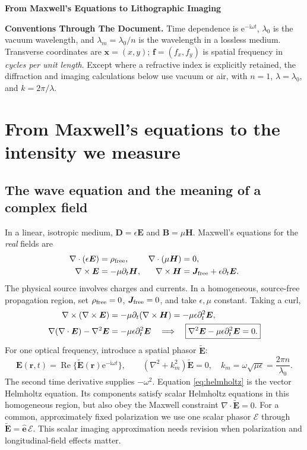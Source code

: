 \documentclass[11pt,a4paper]{article}
\numberwithin{equation}{section}
\newcommand{\ii}{\mathrm{i}}
\newcommand{\ee}{\mathrm{e}}
\newcommand{\vct}[1]{\bm{#1}}
\newcommand{\Real}{\operatorname{Re}}
\begin{document}
{\LARGE\color{ink}\bfseries From Maxwell's Equations to Lithographic Imaging\par}

\vspace{5mm}

\textbf{Conventions Through The Document.} Time dependence is $\ee^{-\ii\omega t}$, $\lambda_0$
is the vacuum wavelength, and $\lambda_m=\lambda_0/n$ is the wavelength
in a lossless medium. Transverse coordinates are $\vct x=(x,y)$;
$\vct f=(f_x,f_y)$ is spatial frequency in \emph{cycles per unit length}.
Except where a refractive index is explicitly retained, the diffraction
and imaging calculations below use vacuum or air, with
$n=1$, $\lambda=\lambda_0$, and $k=2\pi/\lambda$.

\section{From Maxwell's equations to the intensity we measure}
\subsection{The wave equation and the meaning of a complex field}
In a linear, isotropic medium, $\vct D=\epsilon\vct E$ and
$\vct B=\mu\vct H$. Maxwell's equations for the \emph{real} fields are
\begin{align}
\nabla\cdot(\epsilon\vct E)&=\rho_{\rm free},&
\nabla\cdot(\mu\vct H)&=0,\notag\\
\nabla\times\vct E&=-\mu\partial_t\vct H,&
\nabla\times\vct H&=\vct J_{\rm free}+\epsilon\partial_t\vct E.
\end{align}
The physical source involves charges and currents. In a homogeneous,
source-free propagation region, set $\rho_{\rm free}=0$,
$\vct J_{\rm free}=0$, and take $\epsilon,\mu$ constant. Taking a curl,
\begin{align}
\nabla\times(\nabla\times\vct E)
&=-\mu\partial_t(\nabla\times\vct H)
=-\mu\epsilon\partial_t^2\vct E,\notag\\
\nabla(\nabla\cdot\vct E)-\nabla^2\vct E
&=-\mu\epsilon\partial_t^2\vct E
\quad\Longrightarrow\quad
\boxed{\nabla^2\vct E-\mu\epsilon\partial_t^2\vct E=0.}
\end{align}
For one optical frequency, introduce a spatial phasor
$\widetilde{\vct E}$:
\begin{equation}
\vct E(\vct r,t)=\Real\{\widetilde{\vct E}(\vct r)\ee^{-\ii\omega t}\},
\qquad
\boxed{(\nabla^2+k_m^2)\widetilde{\vct E}=0,\quad
k_m=\omega\sqrt{\mu\epsilon}=\frac{2\pi n}{\lambda_0}.}
\label{eq:helmholtz}
\end{equation}
The second time derivative supplies $-\omega^2$. Equation
\eqref{eq:helmholtz} is the vector Helmholtz equation. Its components
satisfy scalar Helmholtz equations in this homogeneous region, but also
obey the Maxwell constraint $\nabla\cdot\widetilde{\vct E}=0$.
For a common, approximately fixed polarization we use one scalar phasor
$\mathcal E$ through $\widetilde{\vct E}=\widehat{\vct e}\,\mathcal E$.
This scalar imaging approximation needs revision when polarization and
longitudinal-field effects matter.
\end{document}
